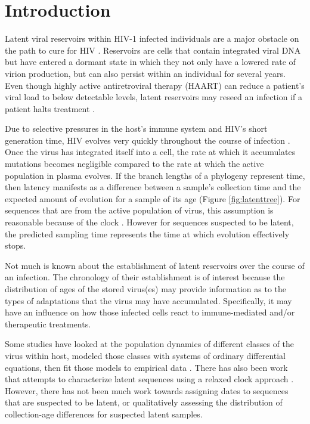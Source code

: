 \section{Introduction} \label{sec:intro}
Latent viral reservoirs within HIV-1 infected individuals are a major obstacle on the path to cure for HIV \citep{Pace11}. 
Reservoirs are cells that contain integrated viral DNA but have entered a dormant state in which they not only have a lowered rate of virion production, but can also persist within an individual for several years.
Even though highly active antiretroviral therapy (HAART) can reduce a patient's viral load to below detectable levels, latent reservoirs may reseed an infection if a patient halts treatment \citep{Joos08, Pomerantz03, Richman09}.


Due to selective pressures in the host's immune system and HIV's short generation time, HIV evolves very quickly throughout the course of infection \citep{Alizon13, Shankarappa99, Rambaut04}. 
Once the virus has integrated itself into a cell, the rate at which it accumulates mutations becomes negligible compared to the rate at which the active population in plasma evolves. 
If the branch lengths of a phylogeny represent time, then latency manifests as a difference between a sample's collection time and the expected amount of evolution for a sample of its age (Figure \ref{fig:latenttree}). 
For sequences that are from the active population of virus, this assumption is reasonable because of the clock \citep{Leitner99, Kuhner95, Korber00}.
However for sequences suspected to be latent, the predicted sampling time represents the time at which evolution effectively stops.

Not much is known about the establishment of latent reservoirs over the course of an infection. 
The chronology of their establishment is of interest because the distribution of ages of the stored virus(es) may provide information as to the types of adaptations that the virus may have accumulated. 
Specifically, it may have an influence on how those infected cells react to immune-mediated and/or therapeutic treatments. 

Some studies have looked at the population dynamics of different classes of the virus within host, modeled those classes with systems of ordinary differential equations, then fit those models to empirical data \citep{Althaus14}. 
There has also been work that attempts to characterize latent sequences using a relaxed clock approach \citep{Immonen14}. 
However, there has not been much work towards assigning dates to sequences that are suspected to be latent, or qualitatively assessing the distribution of collection-age differences for suspected latent samples.

